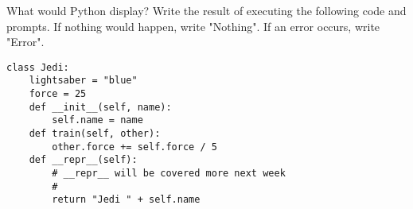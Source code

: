 \begin{blocksection}
\question What would Python display? Write the result of executing the following code and prompts. If nothing would happen, write "Nothing". If an error occurs, write "Error".

\vspace{1.5\baselineskip}

\begin{lstlisting}
class Jedi:
    lightsaber = "blue"
    force = 25
    def __init__(self, name):
        self.name = name
    def train(self, other):
        other.force += self.force / 5
    def __repr__(self):
        # __repr__ will be covered more next week
        # 
        return "Jedi " + self.name
\end{lstlisting}
\end{blocksection}

